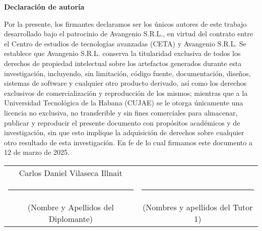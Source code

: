 {\Large \textbf{Declaración de autoría} \vspace{.3cm}}

Por la presente, los firmantes declaramos ser los únicos autores de este trabajo desarrollado bajo el patrocinio de Avangenio S.R.L., en virtud del contrato entre el Centro de estudios de tecnologías avanzadas (CETA) y Avangenio S.R.L. Se establece que Avangenio S.R.L. conserva la titularidad exclusiva de todos los derechos de propiedad intelectual sobre los artefactos generados durante esta investigación, incluyendo, sin limitación, código fuente, documentación, diseños, sistemas de software y cualquier otro producto derivado, así como los derechos exclusivos de comercialización y reproducción de los mismos; mientras que a la Universidad Tecnológica de la Habana (CUJAE) se le otorga únicamente una licencia no exclusiva, no transferible y sin fines comerciales para almacenar, publicar y reproducir el presente documento con propósitos académicos y de investigación, sin que esto implique la adquisición de derechos sobre cualquier otro resultado de esta investigación. En fe de lo cual firmamos este documento a 12 de marzo de 2025.

\vspace{3cm}

\begingroup

\setlength{\tabcolsep}{10pt}
\renewcommand{\arraystretch}{0.5}
\centering
\begin{tabular}{c c}
	Carlos Daniel Vilaseca Illnait      &                                   \\
	\noindent\rule{6cm}{0.4pt}          & \noindent\rule{6cm}{0.4pt}        \\
	(Nombre y Apellidos del Diplomante) & (Nombres y apellidos del Tutor 1)
\end{tabular}
\vspace{3cm}

\endgroup

